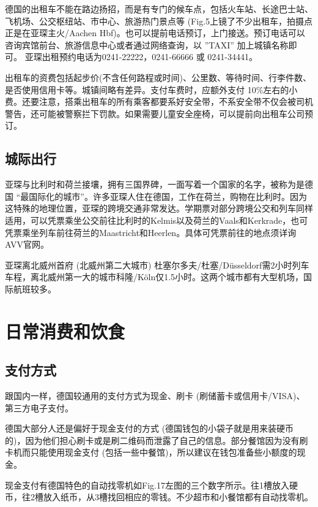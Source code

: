     德国的出租车不能在路边扬招，而是有专门的候车点，包括火车站、长途巴士站、飞机场、公交枢纽站、市中心、旅游热门景点等 (Fig.5上镜了不少出租车，拍摄点正是在亚琛主火/Aachen Hbf)。也可以提前电话预订，上门接送。预订电话可以咨询宾馆前台、旅游信息中心或者通过网络查询，以 ”TAXI” 加上城镇名称即可。 亚琛出租预约电话为0241-22222，0241-66666 或 0241-34441。

    出租车的资费包括起步价(不含任何路程或时间)、公里数、等待时间、行李件数、是否使用信用卡等。城镇间略有差异。支付车费时，应额外支付 10\%左右的小费。还要注意，搭乘出租车的所有乘客都要系好安全带，不系安全带不仅会被司机警告，还可能被警察拦下罚款。如果需要儿童安全座椅，可以提前向出租车公司预订。

  \subsection{城际出行}\label{subsec:城际出行}

    亚琛与比利时和荷兰接壤，拥有三国界碑，一面写着一个国家的名字，被称为是德国 “最国际化的城市”。许多亚琛人住在德国，工作在荷兰，购物在比利时。因为这特殊的地理位置，亚琛的跨境交通非常发达。学期票对部分跨境公交和列车同样适用，可以凭票乘坐公交前往比利时的Kelmis以及荷兰的Vaals和Kerkrade，也可凭票乘坐列车前往荷兰的Maastricht和Heerlen。具体可凭票前往的地点须详询AVV官网。

    亚琛离北威州首府 (北威州第二大城市) 杜塞尔多夫/杜塞/Düsseldorf需2小时列车车程，离北威州第一大的城市科隆/Köln仅1.5小时。这两个城市都有大型机场，国际航班较多。

\section{日常消费和饮食}\label{sec:日常消费和饮食}

  \subsection{支付方式}\label{subsec:支付方式}

    跟国内一样，德国较通用的支付方式为现金、刷卡 (刷储蓄卡或信用卡/VISA)、第三方电子支付。

    德国大部分人还是偏好于现金支付的方式 (德国钱包的小袋子就是用来装硬币的)，因为他们担心刷卡或是刷二维码而泄露了自己的信息。部分餐馆因为没有刷卡机而只能使用现金支付 (包括一些中餐馆)，所以建议在钱包准备些小额度的现金。

    现金支付有德国特色的自动找零机如Fig.17左图的三个数字所示。往1槽放入硬币，往2槽放入纸币，从3槽找回相应的零钱。不少超市和小餐馆都有自动找零机。

